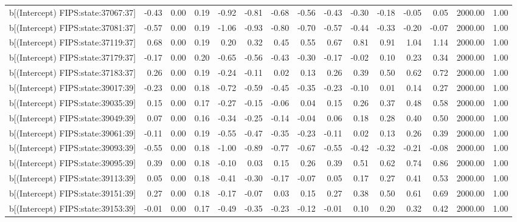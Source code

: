 \begin{table}[ht]
\begin{tabular}{rrrrrrrrrrrrrrr}
  b[(Intercept) FIPS:state:37067:37] & -0.43 & 0.00 & 0.19 & -0.92 & -0.81 & -0.68 & -0.56 & -0.43 & -0.30 & -0.18 & -0.05 & 0.05 & 2000.00 & 1.00 \\ 
  b[(Intercept) FIPS:state:37081:37] & -0.57 & 0.00 & 0.19 & -1.06 & -0.93 & -0.80 & -0.70 & -0.57 & -0.44 & -0.33 & -0.20 & -0.07 & 2000.00 & 1.00 \\ 
  b[(Intercept) FIPS:state:37119:37] & 0.68 & 0.00 & 0.19 & 0.20 & 0.32 & 0.45 & 0.55 & 0.67 & 0.81 & 0.91 & 1.04 & 1.14 & 2000.00 & 1.00 \\ 
  b[(Intercept) FIPS:state:37179:37] & -0.17 & 0.00 & 0.20 & -0.65 & -0.56 & -0.43 & -0.30 & -0.17 & -0.02 & 0.10 & 0.23 & 0.34 & 2000.00 & 1.00 \\ 
  b[(Intercept) FIPS:state:37183:37] & 0.26 & 0.00 & 0.19 & -0.24 & -0.11 & 0.02 & 0.13 & 0.26 & 0.39 & 0.50 & 0.62 & 0.72 & 2000.00 & 1.00 \\ 
  b[(Intercept) FIPS:state:39017:39] & -0.23 & 0.00 & 0.18 & -0.72 & -0.59 & -0.45 & -0.35 & -0.23 & -0.10 & 0.01 & 0.14 & 0.27 & 2000.00 & 1.00 \\ 
  b[(Intercept) FIPS:state:39035:39] & 0.15 & 0.00 & 0.17 & -0.27 & -0.15 & -0.06 & 0.04 & 0.15 & 0.26 & 0.37 & 0.48 & 0.58 & 2000.00 & 1.00 \\ 
  b[(Intercept) FIPS:state:39049:39] & 0.07 & 0.00 & 0.16 & -0.34 & -0.25 & -0.14 & -0.04 & 0.06 & 0.18 & 0.28 & 0.40 & 0.50 & 2000.00 & 1.00 \\ 
  b[(Intercept) FIPS:state:39061:39] & -0.11 & 0.00 & 0.19 & -0.55 & -0.47 & -0.35 & -0.23 & -0.11 & 0.02 & 0.13 & 0.26 & 0.39 & 2000.00 & 1.00 \\ 
  b[(Intercept) FIPS:state:39093:39] & -0.55 & 0.00 & 0.18 & -1.00 & -0.89 & -0.77 & -0.67 & -0.55 & -0.42 & -0.32 & -0.21 & -0.08 & 2000.00 & 1.00 \\ 
  b[(Intercept) FIPS:state:39095:39] & 0.39 & 0.00 & 0.18 & -0.10 & 0.03 & 0.15 & 0.26 & 0.39 & 0.51 & 0.62 & 0.74 & 0.86 & 2000.00 & 1.00 \\ 
  b[(Intercept) FIPS:state:39113:39] & 0.05 & 0.00 & 0.18 & -0.41 & -0.30 & -0.17 & -0.07 & 0.05 & 0.17 & 0.27 & 0.41 & 0.53 & 2000.00 & 1.00 \\ 
  b[(Intercept) FIPS:state:39151:39] & 0.27 & 0.00 & 0.18 & -0.17 & -0.07 & 0.03 & 0.15 & 0.27 & 0.38 & 0.50 & 0.61 & 0.69 & 2000.00 & 1.00 \\ 
  b[(Intercept) FIPS:state:39153:39] & -0.01 & 0.00 & 0.17 & -0.49 & -0.35 & -0.23 & -0.12 & -0.01 & 0.10 & 0.20 & 0.32 & 0.42 & 2000.00 & 1.00 \\ 

\end{tabular}
\end{table}
